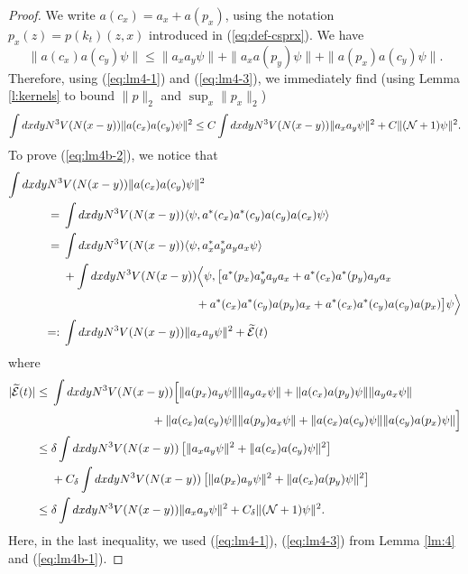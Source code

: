 \documentclass[11pt,a4paper]{article}
\newcommand{\wt}{\widetilde}
\newcommand{\cE}{{\cal E}}
\newcommand{\cN}{{\cal N}}
\begin{document}
\begin{proof}
We write $a (c_x) = a_x + a (p_x)$, using the notation $p_x (z) = p (k_t) (z,x)$ introduced in (\ref{eq:def-csprx}). We have
\[ \| a (c_x) a (c_y) \psi \| \leq \| a_x a_y \psi \| + \| a_x a (p_y) \psi \| + \| a (p_x) a (c_y) \psi \|. \] 
Therefore, using (\ref{eq:lm4-1}) and (\ref{eq:lm4-3}), we immediately find (using Lemma \ref{l:kernels} to bound $\| p \|_2$ and $\sup_x \| p_x \|_2$)
\[ \int dx dy N^3 V(N(x-y)) \| a(c_x) a(c_y) \psi \|^2 \leq C \int dx dy N^3 V (N (x-y)) \| a_x a_y \psi \|^2 + C \| (\cN+1) \psi \|^2. \]
To prove (\ref{eq:lm4b-2}), we notice that
\[ \begin{split} 
\int dx dy N^3 &V (N(x-y)) \| a (c_x) a(c_y) \psi \|^2 \\ = \; & \int dx dy N^3 V (N(x-y)) \langle \psi , a^* (c_x) a^* (c_y) a(c_y) a(c_x) \psi \rangle \\
= \; & \int dx dy N^3 V (N(x-y)) \langle \psi , a^*_x a^*_y a_y a_x \psi \rangle \\
&+\int dx dy N^3 V (N(x-y))  \Big\langle \psi , \big[ a^* (p_x) a^*_y a_y a_x + a^* (c_x) a^* (p_y) a_y a_x \\ &\hspace{4cm} + a^* (c_x) a^* (c_y) a (p_y) a_x + a^* (c_x) a^* (c_y) a (c_y) a(p_x) \big] \psi \Big\rangle \\
=: \; & \int dx dy N^3 V (N (x-y)) \| a_x a_y \psi \|^2 + \wt{\cE} (t) \end{split}\]
where
\[ \begin{split}
|\wt{\cE} (t)| \leq \; & \int dx dy N^3 V(N(x-y)) \Big[ \| a (p_x) a_y \psi \| \| a_y a_x \psi \| + \| a(c_x) a(p_y) \psi \| \| a_y a_x \psi \| \\ &\hspace{3cm} 
+ \| a (c_x) a (c_y) \psi \| \| a(p_y) a_x \psi \| + \| a (c_x) a(c_y) \psi \| \| a(c_y) a(p_x) \psi \| \Big]  \\ \leq\; & \delta \int dx dy N^3 V(N (x-y)) \left[ \| a_x a_y \psi \|^2 + \| a (c_x) a(c_y) \psi \|^2 \right] \\ &+ C_\delta \int dx dy N^3 V(N (x-y)) \left[ \| a(p_x) a_y \psi \|^2 + \| a(c_x) a(p_y) \psi \|^2 \right] 
\\ \leq \; & \delta \int dx dy N^3 V(N (x-y)) \| a_x a_y \psi \|^2 +
C_\delta \| (\cN+1) \psi \|^2. \end{split} \]
Here, in the last inequality, we used (\ref{eq:lm4-1}), (\ref{eq:lm4-3}) from Lemma \ref{lm:4} and 
(\ref{eq:lm4b-1}).
\end{proof}
\end{document}
